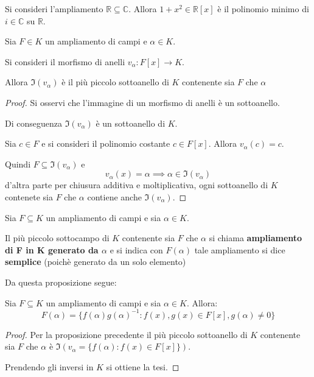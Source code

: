 \documentclass[../main.tex]{subfiles}
\begin{document}
\begin{example}
    Si consideri l'ampliamento $\mathbb{R} \subseteq \mathbb{C}$. Allora $1 + x^2 \in \mathbb{R}[x]$ è il polinomio minimo di $i \in \mathbb{C}$ su $\mathbb{R}$.
\end{example}
\begin{proposition}
    Sia $F \in K$ un ampliamento di campi e $\alpha \in K$.

    Si consideri il morfismo di anelli $v_\alpha: F[x] \rightarrow K$.

    Allora $\Im(v_\alpha)$ è il più piccolo sottoanello di $K$ contenente sia $F$ che $\alpha$
\end{proposition}
\begin{proof}
    Si osservi che l'immagine di un morfismo di anelli è un sottoanello.

    Di conseguenza $\Im(v_\alpha)$ è un sottoanello di $K$.

    Sia $c \in F$ e si consideri il polinomio costante $c \in F[x]$. Allora $v_\alpha(c)=c$.

    Quindi $F \subseteq \Im(v_\alpha)$ e
    \[
        v_\alpha(x) = \alpha \implies \alpha \in \Im(v_\alpha)
    \]
    d'altra parte per chiusura additiva e moltiplicativa, ogni sottoanello di $K$ contenete sia $F$ che $\alpha$ contiene anche $\Im(v_\alpha)$.
\end{proof}

\begin{proposition}
    Sia $F \subseteq K$ un ampliamento di campi e sia $\alpha \in K$.

    Il più piccolo sottocampo di $K$ contenente sia $F$ che $\alpha$ si chiama \textbf{ampliamento di F in K generato da $\alpha$} e si indica con $F(\alpha)$ tale ampliamento si dice \textbf{semplice} (poichè generato da un solo elemento)
\end{proposition}

Da questa proposizione segue:

\begin{corollary}
    Sia $F \subseteq K$ un ampliamento di campi e sia $\alpha \in K$. Allora:
    \begin{equation*}
        F(\alpha) = \{f(\alpha)g(\alpha)^{-1} : f(x),g(x) \in F[x], g(\alpha) \neq 0\}
    \end{equation*}
\end{corollary}
\begin{proof}
    Per la proposizione precedente il più piccolo sottoanello di $K$ contenente sia $F$ che $\alpha$ è $\Im(v_\alpha = \{f(\alpha) : f(x) \in F[x]\})$.

    Prendendo gli inversi in $K$ si ottiene la tesi.
\end{proof}
\end{document}

